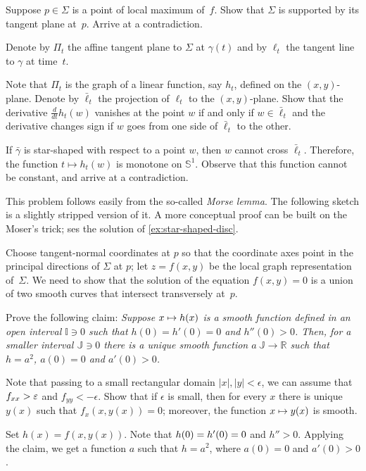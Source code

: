 \begin{multicols}{2}
 Suppose $p\in \Sigma$ is a point of local maximum of~$f$.
Show that $\Sigma$ is supported by its tangent plane at~$p$.
Arrive at a contradiction.


Denote by $\Pi_t$ the affine tangent plane to $\Sigma$ at $\gamma(t)$ and by $\ell_t$ the tangent line to $\gamma$ at time~$t$.

Note that $\Pi_t$ is the graph of a linear function, say $h_t$, defined on the $(x, y)$-plane.
Denote by $\bar\ell_t$ the projection of $\ell_t$ to the $(x, y)$-plane.
Show that the derivative $\tfrac{d}{dt}h_t(w)$ vanishes at the point $w$ if and only if $w\in \bar\ell_t$ 
and the derivative changes sign if $w$ goes from one side of $\bar\ell_t$ to the other.

If $\bar\gamma$ is star-shaped with respect to a point $w$, then $w$ cannot cross $\bar\ell_t$.
Therefore, the function $t\mapsto h_t(w)$ is monotone on $\mathbb{S}^1$.
Observe that this function cannot be constant, and arrive at a contradiction.

This problem follows easily from the so-called \emph{Morse lemma}.
The following sketch is a slightly stripped version of it.
A more conceptual proof \cite{palais} can be built on the Moser's trick; ses the solution of \ref{ex:star-shaped-disc}.

\medskip

Choose tangent-normal coordinates at $p$ so that the coordinate axes point in the principal directions of $\Sigma$ at $p$;
let $z=f(x,y)$ be the local graph representation of~$\Sigma$.
We need to show that the solution of the equation $f(x,y)=0$ is a union of two smooth curves that intersect transversely at~$p$.

Prove the following claim:
\textit{Suppose $x\z\mapsto h(x)$ is a smooth function defined in an open interval $\mathbb{I}\ni0$ such that $h(0)=h'(0)=0$ and $h''(0)>0$.
Then, for a smaller interval $\mathbb{J}\ni0$ there is a unique smooth function $a\:\mathbb{J}\to\mathbb{R}$ such that $h=a^2$, $a(0)=0$ and $a'(0)> 0$.}

Note that passing to a small rectangular domain $|x|,|y|<\epsilon$, we can assume that $f_{xx}\z>\epsilon$ and $f_{yy}<-\epsilon$. 
Show that if $\epsilon$ is small, then for every $x$ there is unique $y(x)$ such that $f_x(x,y(x))=0$; 
moreover, the function $x\z\mapsto y(x)$ is smooth.

Set $h(x)=f(x,y(x))$.
Note that $h(0)\z=h'(0)=0$ and $h''>0$.
Applying the claim, we get a function $a$ such that $h=a^2$, where $a(0)=0$ and $a'(0)>0$.


\end{multicols}
